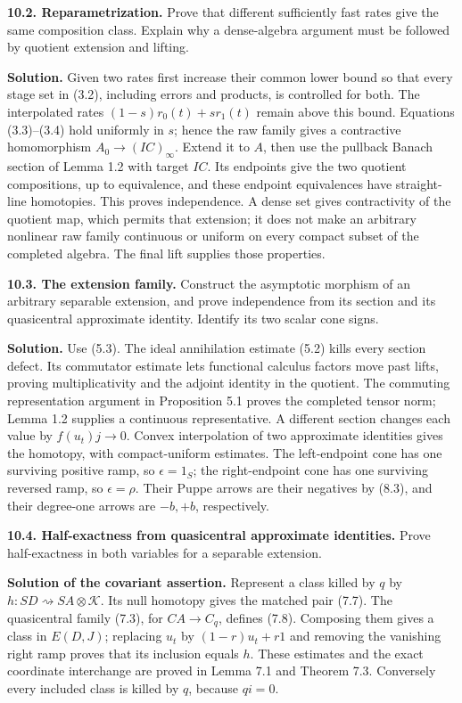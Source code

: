 \documentclass[
  11pt,
]{article}
\begin{document}
\textbf{10.2. Reparametrization.} Prove that different sufficiently fast
rates give the same composition class. Explain why a dense-algebra
argument must be followed by quotient extension and lifting.

\textbf{Solution.} Given two rates first increase their common lower
bound so that every stage set in (3.2), including errors and products,
is controlled for both. The interpolated rates \((1-s)r_0(t)+sr_1(t)\)
remain above this bound. Equations (3.3)--(3.4) hold uniformly in \(s\);
hence the raw family gives a contractive homomorphism
\(A_0\to(IC)_\infty\). Extend it to \(A\), then use the pullback Banach
section of Lemma 1.2 with target \(IC\). Its endpoints give the two
quotient compositions, up to equivalence, and these endpoint
equivalences have straight-line homotopies. This proves independence. A
dense set gives contractivity of the quotient map, which permits that
extension; it does not make an arbitrary nonlinear raw family continuous
or uniform on every compact subset of the completed algebra. The final
lift supplies those properties.

\textbf{10.3. The extension family.} Construct the asymptotic morphism
of an arbitrary separable extension, and prove independence from its
section and its quasicentral approximate identity. Identify its two
scalar cone signs.

\textbf{Solution.} Use (5.3). The ideal annihilation estimate (5.2)
kills every section defect. Its commutator estimate lets functional
calculus factors move past lifts, proving multiplicativity and the
adjoint identity in the quotient. The commuting representation argument
in Proposition 5.1 proves the completed tensor norm; Lemma 1.2 supplies
a continuous representative. A different section changes each value by
\(f(u_t)j\to0\). Convex interpolation of two approximate identities
gives the homotopy, with compact-uniform estimates. The left-endpoint
cone has one surviving positive ramp, so \(\epsilon=1_S\); the
right-endpoint cone has one surviving reversed ramp, so
\(\epsilon=\rho\). Their Puppe arrows are their negatives by (8.3), and
their degree-one arrows are \(-b,+b\), respectively.

\textbf{10.4. Half-exactness from quasicentral approximate identities.}
Prove half-exactness in both variables for a separable extension.

\textbf{Solution of the covariant assertion.} Represent a class killed
by \(q\) by \(h:SD \rightsquigarrow SA\otimes\mathcal K\). Its null
homotopy gives the matched pair (7.7). The quasicentral family (7.3),
for \(CA\to C_q\), defines (7.8). Composing them gives a class in
\(E(D,J)\); replacing \(u_t\) by \((1-r)u_t+r1\) and removing the
vanishing right ramp proves that its inclusion equals \(h\). These
estimates and the exact coordinate interchange are proved in Lemma 7.1
and Theorem 7.3. Conversely every included class is killed by \(q\),
because \(qi=0\).
\end{document}
